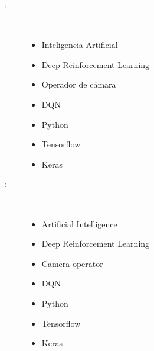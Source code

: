 \begin{multicols}{2}
\begin{description}
\item [\palabraschaveprincipal:] \mbox{} \\[-20pt]
  \begin{itemize}
  	\item Inteligencia Artificial
  	\item Deep Reinforcement Learning
  	\item Operador de cámara
  	\item DQN
  	\item Python
  	\item Tensorflow
  	\item Keras
  \end{itemize}	 %
\end{description}
\begin{description}
\item [\palabraschavesecundaria:] \mbox{} \\[-20pt]
  \begin{itemize}
	\item Artificial Intelligence
	\item Deep Reinforcement Learning
	\item Camera operator
	\item DQN
	\item Python
	\item Tensorflow
	\item Keras
\end{itemize}%
\end{description}
\end{multicols}
